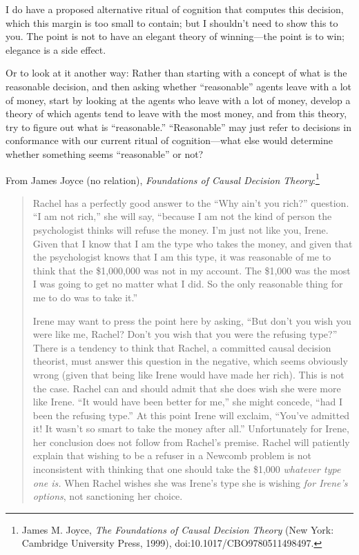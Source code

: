  I do have a proposed alternative ritual of cognition that computes
this decision, which this margin is too small to contain; but I
shouldn't need to show this to you. The point is not to
have an elegant theory of winning---the point is to win; elegance is a
side effect.


 Or to look at it another way: Rather than starting with a concept
of what is the reasonable decision, and then asking whether
``reasonable'' agents leave with a
lot of money, start by looking at the agents who leave with a lot of
money, develop a theory of which agents tend to leave with the most
money, and from this theory, try to figure out what is
``reasonable.''
``Reasonable'' may just refer to
decisions in conformance with our current ritual of cognition---what
else would determine whether something seems
``reasonable'' or not?

{
 From James Joyce (no relation), \textit{Foundations of Causal
Decision Theory}:\footnote{James M. Joyce, \textit{The Foundations of Causal Decision
Theory} (New York: Cambridge University Press, 1999),
doi:10.1017/CBO9780511498497.}}

\begin{quotation}

 Rachel has a perfectly good answer to the ``Why
ain't you rich?'' question.
``I am not rich,'' she will say,
``because I am not the kind of person the psychologist
thinks will refuse the money. I'm just not like you,
Irene. Given that I know that I am the type who takes the money, and
given that the psychologist knows that I am this type, it was
reasonable of me to think that the \$1,000,000 was not in my account.
The \$1,000 was the most I was going to get no matter what I did. So
the only reasonable thing for me to do was to take
it.''

{
 Irene may want to press the point here by asking,
``But don't you wish you were like me,
Rachel? Don't you wish that you were the refusing
type?'' There is a tendency to think that Rachel, a
committed causal decision theorist, must answer this question in the
negative, which seems obviously wrong (given that being like Irene
would have made her rich). This is not the case. Rachel can and should
admit that she does wish she were more like Irene.
``It would have been better for
me,'' she might concede, ``had I
been the refusing type.'' At this point Irene will
exclaim, ``You've admitted it! It
wasn't so smart to take the money after
all.'' Unfortunately for Irene, her conclusion does
not follow from Rachel's premise. Rachel will patiently
explain that wishing to be a refuser in a Newcomb problem is not
inconsistent with thinking that one should take the \$1,000
\textit{whatever type one is.} When Rachel wishes she was
Irene's type she is wishing \textit{for
  Irene's options}, not sanctioning her choice.}
\end{quotation}


